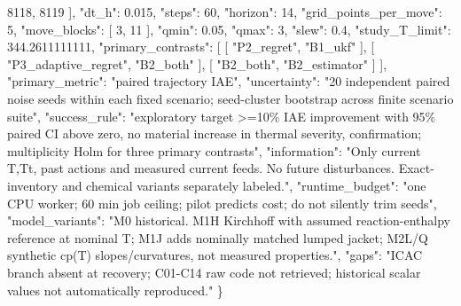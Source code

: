 \documentclass[
  11pt,
]{article}
\newenvironment{Shaded}{}{}
\newcommand{\DataTypeTok}[1]{\textcolor[rgb]{0.56,0.13,0.00}{#1}}
\newcommand{\DecValTok}[1]{\textcolor[rgb]{0.25,0.63,0.44}{#1}}
\newcommand{\FloatTok}[1]{\textcolor[rgb]{0.25,0.63,0.44}{#1}}
\newcommand{\FunctionTok}[1]{\textcolor[rgb]{0.02,0.16,0.49}{#1}}
\newcommand{\OtherTok}[1]{\textcolor[rgb]{0.00,0.44,0.13}{#1}}
\newcommand{\StringTok}[1]{\textcolor[rgb]{0.25,0.44,0.63}{#1}}
\begin{document}
\begin{Shaded}
\begin{Highlighting}[]
    \DecValTok{8118}\OtherTok{,}
    \DecValTok{8119}
  \OtherTok{]}\FunctionTok{,}
  \DataTypeTok{"dt\_h"}\FunctionTok{:} \FloatTok{0.015}\FunctionTok{,}
  \DataTypeTok{"steps"}\FunctionTok{:} \DecValTok{60}\FunctionTok{,}
  \DataTypeTok{"horizon"}\FunctionTok{:} \DecValTok{14}\FunctionTok{,}
  \DataTypeTok{"grid\_points\_per\_move"}\FunctionTok{:} \DecValTok{5}\FunctionTok{,}
  \DataTypeTok{"move\_blocks"}\FunctionTok{:} \OtherTok{[}
    \DecValTok{3}\OtherTok{,}
    \DecValTok{11}
  \OtherTok{]}\FunctionTok{,}
  \DataTypeTok{"qmin"}\FunctionTok{:} \FloatTok{0.05}\FunctionTok{,}
  \DataTypeTok{"qmax"}\FunctionTok{:} \DecValTok{3}\FunctionTok{,}
  \DataTypeTok{"slew"}\FunctionTok{:} \FloatTok{0.4}\FunctionTok{,}
  \DataTypeTok{"study\_T\_limit"}\FunctionTok{:} \FloatTok{344.2611111111}\FunctionTok{,}
  \DataTypeTok{"primary\_contrasts"}\FunctionTok{:} \OtherTok{[}
    \OtherTok{[}
      \StringTok{"P2\_regret"}\OtherTok{,}
      \StringTok{"B1\_ukf"}
    \OtherTok{],}
    \OtherTok{[}
      \StringTok{"P3\_adaptive\_regret"}\OtherTok{,}
      \StringTok{"B2\_both"}
    \OtherTok{],}
    \OtherTok{[}
      \StringTok{"B2\_both"}\OtherTok{,}
      \StringTok{"B2\_estimator"}
    \OtherTok{]}
  \OtherTok{]}\FunctionTok{,}
  \DataTypeTok{"primary\_metric"}\FunctionTok{:} \StringTok{"paired trajectory IAE"}\FunctionTok{,}
  \DataTypeTok{"uncertainty"}\FunctionTok{:} \StringTok{"20 independent paired noise seeds within each fixed scenario; seed{-}cluster bootstrap across finite scenario suite"}\FunctionTok{,}
  \DataTypeTok{"success\_rule"}\FunctionTok{:} \StringTok{"exploratory target \textgreater{}=10\% IAE improvement with 95\% paired CI above zero, no material increase in thermal severity, confirmation; multiplicity Holm for three primary contrasts"}\FunctionTok{,}
  \DataTypeTok{"information"}\FunctionTok{:} \StringTok{"Only current T,Tt, past actions and measured current feeds. No future disturbances. Exact{-}inventory and chemical variants separately labeled."}\FunctionTok{,}
  \DataTypeTok{"runtime\_budget"}\FunctionTok{:} \StringTok{"one CPU worker; 60 min job ceiling; pilot predicts cost; do not silently trim seeds"}\FunctionTok{,}
  \DataTypeTok{"model\_variants"}\FunctionTok{:} \StringTok{"M0 historical. M1H Kirchhoff with assumed reaction{-}enthalpy reference at nominal T; M1J adds nominally matched lumped jacket; M2L/Q synthetic cp(T) slopes/curvatures, not measured properties."}\FunctionTok{,}
  \DataTypeTok{"gaps"}\FunctionTok{:} \StringTok{"ICAC branch absent at recovery; C01{-}C14 raw code not retrieved; historical scalar values not automatically reproduced."}
\FunctionTok{\}}
\end{Highlighting}
\end{Shaded}
\end{document}
